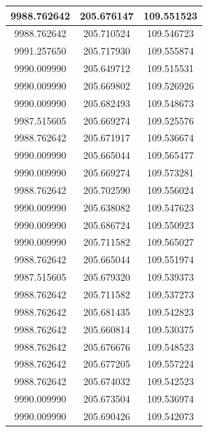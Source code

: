 \documentclass[a4paper,14pt]{article}
\begin{document}
\begin{longtable}[c]{|c|c|c|}
	9988.762642       & 205.676147           & 109.551523        \\ \hline
	9988.762642       & 205.710524           & 109.546723        \\ \hline
	9991.257650       & 205.717930           & 109.555874        \\ \hline
	9990.009990       & 205.649712           & 109.515531        \\ \hline
	9990.009990       & 205.669802           & 109.526926        \\ \hline
	9990.009990       & 205.682493           & 109.548673        \\ \hline
	9987.515605       & 205.669274           & 109.525576        \\ \hline
	9988.762642       & 205.671917           & 109.536674        \\ \hline
	9990.009990       & 205.665044           & 109.565477        \\ \hline
	9990.009990       & 205.669274           & 109.573281        \\ \hline
	9988.762642       & 205.702590           & 109.556024        \\ \hline
	9990.009990       & 205.638082           & 109.547623        \\ \hline
	9990.009990       & 205.686724           & 109.550923        \\ \hline
	9990.009990       & 205.711582           & 109.565027        \\ \hline
	9988.762642       & 205.665044           & 109.551974        \\ \hline
	9987.515605       & 205.679320           & 109.539373        \\ \hline
	9988.762642       & 205.711582           & 109.537273        \\ \hline
	9988.762642       & 205.681435           & 109.542823        \\ \hline
	9988.762642       & 205.660814           & 109.530375        \\ \hline
	9988.762642       & 205.676676           & 109.548523        \\ \hline
	9988.762642       & 205.677205           & 109.557224        \\ \hline
	9988.762642       & 205.674032           & 109.542523        \\ \hline
	9990.009990       & 205.673504           & 109.536974        \\ \hline
	9990.009990       & 205.690426           & 109.542073        \\ \hline

\end{longtable}
\end{document}
